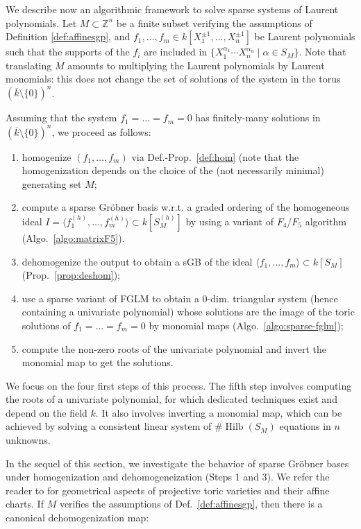 \documentclass[12pt]{article}
\numberwithin{equation}{section}
\numberwithin{theorem}{section}
\newcommand{\Z}{\mathbb{Z}}
\DeclareMathOperator{\hilbert}{Hilb}
\newcommand{\sgp}{S}
\begin{document}
We describe now an algorithmic framework to solve sparse systems of Laurent polynomials.
Let $M\subset \Z^n$ be a finite subset verifying the assumptions of Definition \ref{def:affinesgp}, and $f_1,\ldots, f_m\in k[X_1^{\pm 1},\ldots, X_n^{\pm 1}]$ be Laurent polynomials such that the supports of the $f_i$ are included in $\{X_1^{\alpha_1}\cdots X_n^{\alpha_n}\mid\alpha\in S_M\}$. 
Note that translating $M$ amounts to multiplying the Laurent polynomials by Laurent monomials: this does not change the set of solutions of the system in the torus $\left(\overline k\setminus\{0\}\right)^n$.

Assuming that the system $f_1=\dots=f_m=0$ has finitely-many solutions in $(\overline k\setminus\{0\})^n$, we proceed as follows:
\begin{enumerate}
\item homogenize $(f_1,\ldots, f_m)$ via Def.-Prop.~\ref{def:hom} (note that the homogenization depends on the choice of the (not necessarily minimal) generating set $M$;
\item compute a sparse Gr\"obner
  basis w.r.t. a graded ordering of the homogeneous ideal $I=\langle f_1^{(h)},\ldots, f_m^{(h)}\rangle\subset
  k[\sgp_M^{(h)}]$ by using a variant of $F_4$/$F_5$
  algorithm (Algo.~\ref{algo:matrixF5}). 
\item dehomogenize the output to obtain a sGB of the ideal $\langle f_1,\ldots,f_m\rangle\subset k[\sgp_M]$ (Prop.~\ref{prop:deshom});
\item use a sparse variant of FGLM to obtain a $0$-dim. triangular system (hence containing a univariate polynomial) whose solutions are the image of the toric solutions of $f_1=\dots=f_m=0$ by monomial maps (Algo.~\ref{algo:sparse-fglm});
\item compute the non-zero roots of the univariate polynomial and invert the monomial map to get the solutions.
\end{enumerate}

We focus on the four first steps of this process.  The fifth step
involves computing the roots of a univariate polynomial, for which
dedicated techniques exist and depend on the field $k$. It also
involves inverting a monomial map, which can be achieved by solving a
consistent linear system of $\#\hilbert(S_M)$ equations in $n$ unknowns.

In the sequel of this section, we investigate the behavior of sparse
Gr\"obner bases under homogenization and dehomogeneization (Steps 1 and
3). We refer the reader to \cite[Ch. 2]{CoxLitSch11} for geometrical
aspects of projective toric varieties and their affine charts. If $M$
verifies the assumptions of Def.~\ref{def:affinesgp}, then there is a
canonical dehomogenization map:
\end{document}
